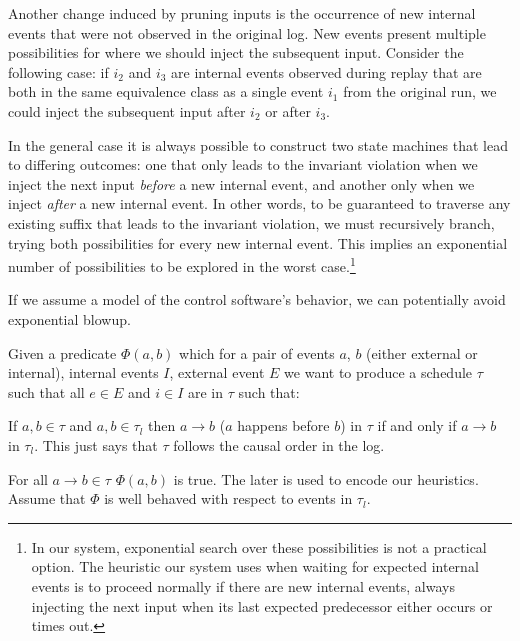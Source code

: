 Another change induced by pruning inputs is the occurrence of new
internal events that were not observed in the original log.
New events present multiple possibilities for where
we should inject the subsequent input. Consider the following case:
if $i_2$ and $i_3$ are internal events observed
during replay that are both in the same equivalence class as a single event $i_1$ from the
original run, we could inject the subsequent input after $i_2$ or after $i_3$.


In the general case it is always possible to construct two state machines that lead
to differing outcomes: one that only leads to the invariant violation when
we inject the next input
\emph{before} a new internal event, and another only when we inject \emph{after} a new internal
event. In other words, to be guaranteed to traverse any existing suffix that leads
to the invariant violation, we must recursively branch, trying both
possibilities for every new internal event. This implies an exponential number of
possibilities to be explored in the worst case.\footnote{
In our system, exponential search over these possibilities is not a practical option.
The heuristic our system uses when waiting for expected internal
events is to proceed normally if there are new internal events,
always injecting the next input when its last expected predecessor
either occurs or times out.}

If we assume a model of the control software's behavior, we can potentially
avoid exponential blowup.

 Given a predicate $\Phi(a, b)$ which for a pair of events $a$, $b$ 
(either external or internal), internal events $I$, external event $E$ we want to produce a schedule $\tau$ such that all $e\in E$ and $i\in
I$ are in $\tau$ such that:

If $a, b \in \tau$ and $a, b\in \tau_l$ then $a \rightarrow b$ ($a$ happens before $b$) in $\tau$ if and only if $a
\rightarrow b$ in $\tau_l$. This just says that $\tau$ follows the causal order in the log.

For all $a\rightarrow b\in \tau$ $\Phi(a, b)$ is true. The later is used to encode our heuristics. Assume that $\Phi$ is
well behaved with respect to events in $\tau_l$.

